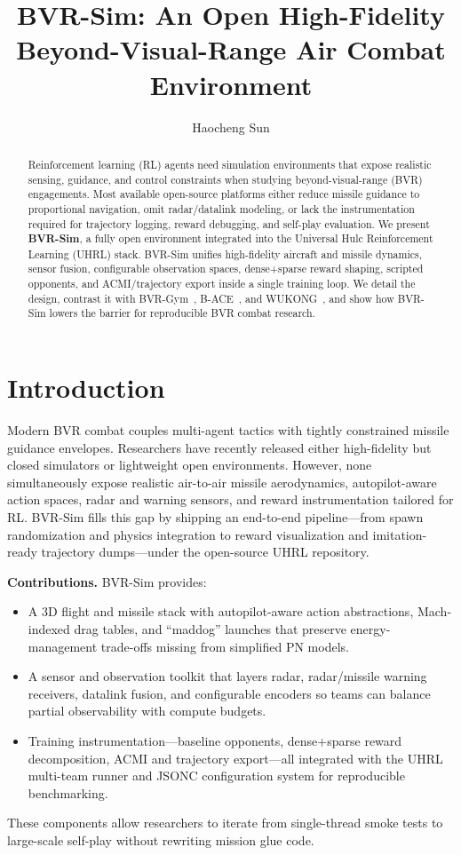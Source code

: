\documentclass[11pt]{article}
\title{BVR-Sim: An Open High-Fidelity Beyond-Visual-Range Air Combat Environment}
\author{Haocheng Sun}
\date{}
\begin{document}
\maketitle

\begin{abstract}
Reinforcement learning (RL) agents need simulation environments that expose realistic sensing, guidance, and control constraints when studying beyond-visual-range (BVR) engagements. Most available open-source platforms either reduce missile guidance to proportional navigation, omit radar/datalink modeling, or lack the instrumentation required for trajectory logging, reward debugging, and self-play evaluation. We present \textbf{BVR-Sim}, a fully open environment integrated into the Universal Hulc Reinforcement Learning (UHRL) stack. BVR-Sim unifies high-fidelity aircraft and missile dynamics, sensor fusion, configurable observation spaces, dense+sparse reward shaping, scripted opponents, and ACMI/trajectory export inside a single training loop. We detail the design, contrast it with BVR-Gym~\cite{scukins2024bvrgym}, B-ACE~\cite{kuroswiski2024bace}, and WUKONG~\cite{piao2020wukong}, and show how BVR-Sim lowers the barrier for reproducible BVR combat research.
\end{abstract}

\section{Introduction}
Modern BVR combat couples multi-agent tactics with tightly constrained missile guidance envelopes. Researchers have recently released either high-fidelity but closed simulators or lightweight open environments. However, none simultaneously expose realistic air-to-air missile aerodynamics, autopilot-aware action spaces, radar and warning sensors, and reward instrumentation tailored for RL. BVR-Sim fills this gap by shipping an end-to-end pipeline---from spawn randomization and physics integration to reward visualization and imitation-ready trajectory dumps---under the open-source UHRL repository.

\textbf{Contributions.} BVR-Sim provides:
\begin{itemize}
    \item A 3D flight and missile stack with autopilot-aware action abstractions, Mach-indexed drag tables, and ``maddog'' launches that preserve energy-management trade-offs missing from simplified PN models.
    \item A sensor and observation toolkit that layers radar, radar/missile warning receivers, datalink fusion, and configurable encoders so teams can balance partial observability with compute budgets.
    \item Training instrumentation---baseline opponents, dense+sparse reward decomposition, ACMI and trajectory export---all integrated with the UHRL multi-team runner and JSONC configuration system for reproducible benchmarking.
\end{itemize}
These components allow researchers to iterate from single-thread smoke tests to large-scale self-play without rewriting mission glue code.
\end{document}
